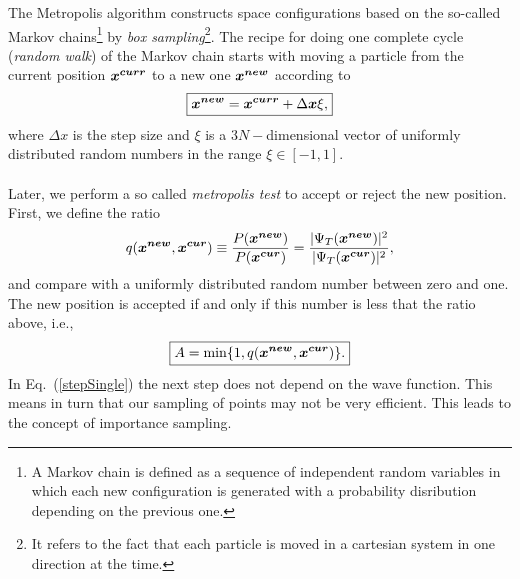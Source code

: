 The Metropolis algorithm constructs space configurations based on the so-called  
Markov chains\footnote{A Markov chain is defined as a sequence of independent random variables in which each new configuration is generated with a probability disribution depending on the previous one\cite{Thijssen}.} by \emph{box sampling}\footnote{It refers to the fact that each particle is moved in a cartesian system in one direction at the time.}. The recipe for doing one complete cycle (\emph{random walk}) of the Markov chain starts with moving a particle from the current position $\boldsymbol{x^{curr}}$ to a new one $\boldsymbol{x^{new}}$ according to
\begin{equation}\label{stepSingle}
\boxed{\boldsymbol{x^{new}} = \boldsymbol{x^{curr}} + \Delta \boldsymbol{x} \xi,}
\end{equation}
where $\Delta x$ is the step size and $\xi$ is a $3N-$dimensional vector of uniformly distributed random numbers in the range $\xi \in [-1, 1]$.\\
\\
\noindent
Later, we perform a so called \emph{metropolis test} to accept or reject the new position. First, we define the ratio 
\begin{equation}\label{qRatio}
q(\boldsymbol{x^{new}}, \boldsymbol{x^{cur}}) \equiv \frac{P(\boldsymbol{x^{new}})}{P(\boldsymbol{x^{cur}})} = \frac{|\Psi_{T}(\boldsymbol{x^{new}})|^2}{|\Psi_{T}(\boldsymbol{x^{cur}})|^2},
\end{equation}
and compare with a uniformly distributed random number between zero and one. The new position is accepted if and only if this number is less that the ratio above, i.e.,
\begin{equation}\label{acceptance}
\boxed{A = \min \{1, q(\boldsymbol{x^{new}}, \boldsymbol{x^{cur}})\}.}
\end{equation}
In Eq.~(\ref{stepSingle}) the next step does not depend on the wave function. This means in turn that our sampling of points may not be very efficient. This leads to the concept of importance sampling. 

